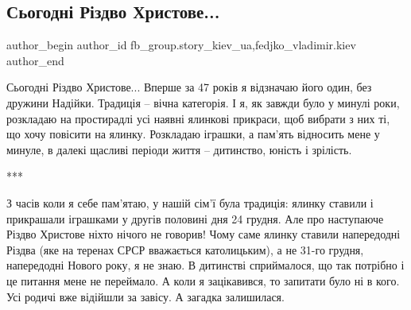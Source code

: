  
 
 
 
 
 
\subsection{Сьогодні Різдво Христове...}
\label{sec:25_12_2021.fb.fb_group.story_kiev_ua.1.rizdvo}
 
\ifcmt
 author_begin
   author_id fb_group.story_kiev_ua,fedjko_vladimir.kiev
 author_end
\fi


Сьогодні Різдво Христове... Вперше за 47 років я відзначаю його один, без дружини
Надійки. Традиція – вічна категорія. І я, як завжди було у минулі роки,
розкладаю на простирадлі усі наявні ялинкові прикраси, щоб вибрати з них ті, що
хочу повісити на ялинку. Розкладаю іграшки, а пам’ять відносить мене у минуле,
в далекі щасливі періоди життя – дитинство, юність і зрілість.

***

З часів коли я себе пам'ятаю, у нашій сім'ї була традиція: ялинку ставили і
прикрашали іграшками у другів половині дня 24 грудня. Але про наступаюче Різдво
Христове ніхто нічого не говорив! Чому саме ялинку ставили напередодні Різдва
(яке на теренах СРСР вважається католицьким), а не 31-го грудня, напередодні
Нового року, я не знаю. В дитинстві сприймалося, що так потрібно і це питання
мене не переймало. А коли я зацікавився, то запитати було ні в кого. Усі родичі
вже відійшли за завісу. А загадка залишилася. 

\begin{multicols}{2} %
\setlength{\parindent}{0pt}



\end{multicols} %

